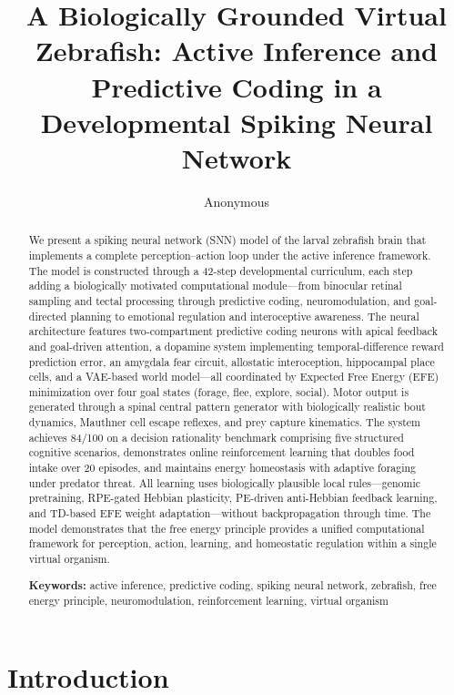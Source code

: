 \documentclass[12pt]{article}
\title{A Biologically Grounded Virtual Zebrafish: Active Inference and
Predictive Coding in a Developmental Spiking Neural Network}
\author{Anonymous}
\date{}
\begin{document}
\maketitle

\begin{abstract}
We present a spiking neural network (SNN) model of the larval zebrafish
brain that implements a complete perception--action loop under the
active inference framework.
The model is constructed through a 42-step developmental curriculum,
each step adding a biologically motivated computational module---from
binocular retinal sampling and tectal processing through predictive
coding, neuromodulation, and goal-directed planning to emotional
regulation and interoceptive awareness.
The neural architecture features two-compartment predictive coding
neurons with apical feedback and goal-driven attention, a dopamine
system implementing temporal-difference reward prediction error,
an amygdala fear circuit, allostatic interoception, hippocampal
place cells, and a VAE-based world model---all coordinated by
Expected Free Energy (EFE) minimization over four goal
states (forage, flee, explore, social).
Motor output is generated through a spinal central pattern generator
with biologically realistic bout dynamics, Mauthner cell escape
reflexes, and prey capture kinematics.
The system achieves 84/100 on a decision rationality benchmark
comprising five structured cognitive scenarios, demonstrates online
reinforcement learning that doubles food intake over 20 episodes,
and maintains energy homeostasis with adaptive foraging under
predator threat.
All learning uses biologically plausible local rules---genomic
pretraining, RPE-gated Hebbian plasticity, PE-driven anti-Hebbian
feedback learning, and TD-based EFE weight adaptation---without
backpropagation through time.
The model demonstrates that the free energy principle provides a
unified computational framework for perception, action, learning,
and homeostatic regulation within a single virtual organism.

\medskip
\noindent\textbf{Keywords:} active inference, predictive coding,
spiking neural network, zebrafish, free energy principle,
neuromodulation, reinforcement learning, virtual organism
\end{abstract}

\section{Introduction}\label{sec:intro}
\end{document}
